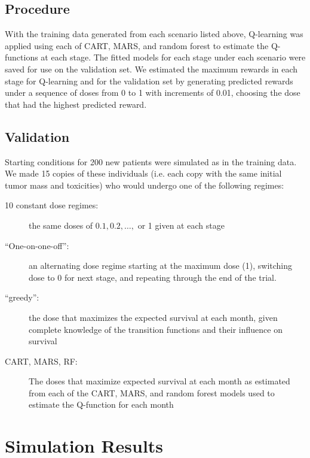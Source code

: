 \documentclass[12pt]{article}
\begin{document}
\subsection{Procedure} %
\label{sub:procedure}

With the training data generated from each scenario listed above, Q-learning was applied using each of CART, MARS, and random forest to estimate the Q-functions at each stage. The fitted models for each stage under each scenario were saved for use on the validation set. We estimated the maximum rewards in each stage for Q-learning and for the validation set by generating predicted rewards under a sequence of doses from 0 to 1 with increments of 0.01, choosing the dose that had the highest predicted reward.


\subsection{Validation} %
\label{sub:validation}

Starting conditions for 200 new patients were simulated as in the training data. We made 15 copies of these individuals (i.e. each copy with the same initial tumor mass and toxicities) who would undergo one of the following regimes:

\begin{description}
  \item [10 constant dose regimes:] the same doses of $0.1, 0.2, \ldots,$ or 1 given at each stage
  \item [``One-on-one-off'':] an alternating dose regime starting at the maximum dose (1), switching dose to 0 for next stage, and repeating through the end of the trial.
  \item [``greedy'':] the dose that maximizes the expected survival at each month, given complete knowledge of the transition functions and their influence on survival
  \item [CART, MARS, RF:] The doses that maximize expected survival at each month as estimated from each of the CART, MARS, and random forest models used to estimate the Q-function for each month
\end{description}



\section{Simulation Results} %
\label{sec:simulation_results}
\end{document}
